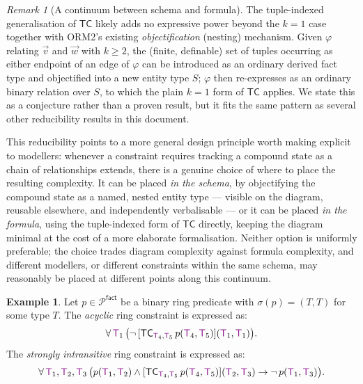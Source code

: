 \documentclass[11pt]{amsart}
\theoremstyle{definition}
\newtheorem{example}{Example}
\theoremstyle{remark}
\newtheorem{remark}[theorem]{Remark}
\newcommand{\Preds}{\mathcal{P}}
\newcommand{\FactPreds}{\Preds^{\textsf{fact}}}
\newcommand{\var}[1]{\mathsf{\textcolor{Plum}{#1}}}
\newcommand{\TC}{\mathsf{TC}}
\begin{document}
\begin{remark}[A continuum between schema and formula]
The tuple-indexed generalisation of $\TC$ likely adds no expressive power
beyond the $k=1$ case together with ORM2's existing \emph{objectification}
(nesting) mechanism. Given $\varphi$ relating $\vec{v}$ and $\vec{w}$ with
$k \geq 2$, the (finite, definable) set of tuples occurring as either
endpoint of an edge of $\varphi$ can be introduced as an ordinary derived
fact type and objectified into a new entity type $S$; $\varphi$ then
re-expresses as an ordinary binary relation over $S$, to which the plain
$k=1$ form of $\TC$ applies. We state this as a conjecture rather than a
proven result, but it fits the same pattern as several other reducibility
results in this document.

This reducibility points to a more general design principle worth making
explicit to modellers: whenever a constraint requires tracking a compound
state as a chain of relationships extends, there is a genuine choice of
where to place the resulting complexity. It can be placed \emph{in the
schema}, by objectifying the compound state as a named, nested entity
type — visible on the diagram, reusable elsewhere, and independently
verbalisable — or it can be placed \emph{in the formula}, using the
tuple-indexed form of $\TC$ directly, keeping the diagram minimal at the
cost of a more elaborate formalisation. Neither option is uniformly
preferable; the choice trades diagram complexity against formula
complexity, and different modellers, or different constraints within the
same schema, may reasonably be placed at different points along this
continuum.
\end{remark}

\begin{example}
\label{ex:ring}
Let $p \in \FactPreds$ be a binary ring predicate with $\sigma(p) = (T, T)$
for some type $T$. The \emph{acyclic} ring constraint is expressed as:
$$\forall\, \var{T}_1\, \bigl(\neg\, [\TC_{\var{T}_4, \var{T}_5}\, p(\var{T}_4,\var{T}_5)](\var{T}_1, \var{T}_1)\bigr).$$
The \emph{strongly intransitive} ring constraint is expressed as:
$$\forall\, \var{T}_1, \var{T}_2, \var{T}_3\, \bigl(p(\var{T}_1,\var{T}_2) \wedge
  [\TC_{\var{T}_4, \var{T}_5}\, p(\var{T}_4,\var{T}_5)](\var{T}_2, \var{T}_3) \to \neg\, p(\var{T}_1,\var{T}_3)\bigr).$$
\end{example}
\end{document}
